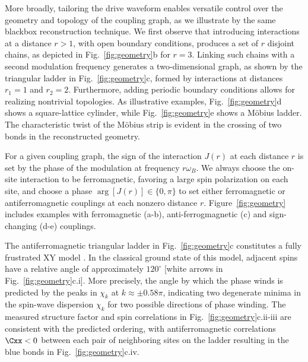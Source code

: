 \documentclass[aps,pra,superscriptaddress,12pt]{revtex4-1} %
\begin{document}
\begin{bibunit}
More broadly, tailoring the drive waveform enables versatile control over the geometry and topology of the coupling graph, as we illustrate by the same blackbox reconstruction technique.  We first observe that introducing interactions at a distance $r>1$, with open boundary conditions, produces a set of $r$ disjoint chains, as depicted in Fig.~\ref{fig:geometry}b for $r=3$.  Linking such chains with a second modulation frequency generates a two-dimensional graph, as shown by the triangular ladder in Fig.~\ref{fig:geometry}c, formed by interactions at distances $r_1=1$ and $r_2 = 2$.  Furthermore, adding periodic boundary conditions allows for realizing nontrivial topologies.  As illustrative examples, Fig.~\ref{fig:geometry}d shows a square-lattice cylinder, while Fig.~\ref{fig:geometry}e shows a M\"{o}bius ladder.  The characteristic twist of the M\"obius strip is evident in the crossing of two bonds in the reconstructed geometry.

For a given coupling graph, the sign of the interaction $J(r)$ at each distance $r$ is set by the phase of the modulation at frequency $r\omega_B$.  We always choose the on-site interaction to be ferromagnetic, favoring a large spin polarization on each site, and choose a phase $\arg[J(r)] \in\{0,\pi\}$ to set either ferromagnetic or antiferromagnetic couplings at each nonzero distance $r$.  Figure~\ref{fig:geometry} includes examples with ferromagnetic (a-b), anti-ferrogmagnetic (c) and sign-changing (d-e) couplings.

The antiferromagnetic triangular ladder in Fig.~\ref{fig:geometry}c constitutes a fully frustrated XY model \cite{lee1998phase}.  In the classical ground state of this model, adjacent spins have a relative angle of approximately $120^\circ$ [white arrows in Fig.~\ref{fig:geometry}c.i].  More precisely, the angle by which the phase winds is predicted by the peaks in $\chi_k$ at $k\approx \pm 0.58\pi$, indicating two degenerate minima in the spin-wave dispersion $\chi_k$ for two possible directions of phase winding.  The measured structure factor and spin correlations in Fig.~\ref{fig:geometry}c.ii-iii are consistent with the predicted ordering, with antiferromagnetic correlations $\Cxx < 0$ between each pair of neighboring sites on the ladder resulting in the blue bonds in Fig.~\ref{fig:geometry}c.iv. 


\end{bibunit}
\end{document}
